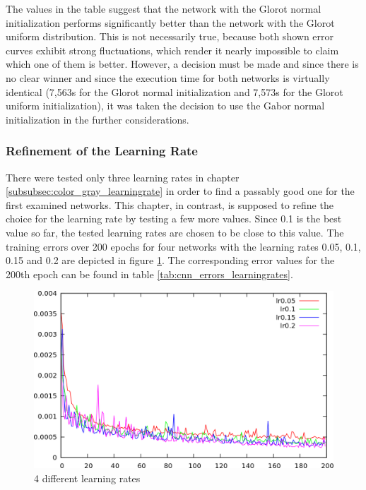 \documentclass[11pt, a4paper]{article}
\begin{document}


The values in the table suggest that the network with the Glorot normal initialization performs significantly better than the network with the Glorot uniform distribution. This is not necessarily true, because both shown error curves exhibit strong fluctuations, which render it nearly impossible to claim which one of them is better. However, a decision must be made and since there is no clear winner and since the execution time for both networks is virtually identical (7,563s for the Glorot normal initialization and 7,573s for the Glorot uniform initialization), it was taken the decision to use the Gabor normal initialization in the further considerations.

\subsubsection{Refinement of the Learning Rate}

There were tested only three learning rates in chapter \ref{subsubsec:color_gray_learningrate} in order to find a passably good one for the first examined networks. This chapter, in contrast, is supposed to refine the choice for the learning rate by testing a few more values. Since 0.1 is the best value so far, the tested learning rates are chosen to be close to this value. The training errors over 200 epochs for four networks with the learning rates 0.05, 0.1, 0.15 and 0.2 are depicted in figure \ref{fig:cnn_learningrates}. The corresponding error values for the 200th epoch can be found in table \ref{tab:cnn_errors_learningrates}.\\

\vspace{-0.4cm}
\begin{figure}[h!]
	\centering
	\includegraphics[width=\textwidth]{results/cnn_learningrates.png}
	\caption{4 different learning rates}
	\label{fig:cnn_learningrates}
\end{figure}
\end{document}
